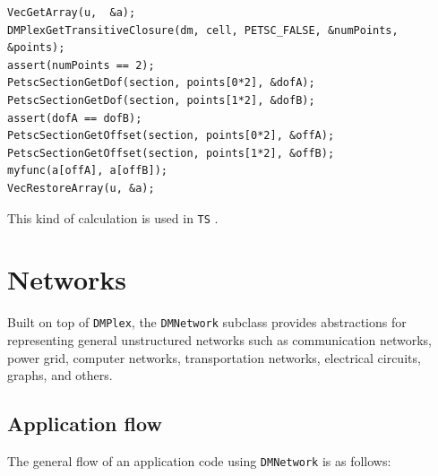 {\begin{lstlisting}
VecGetArray(u,  &a);
DMPlexGetTransitiveClosure(dm, cell, PETSC_FALSE, &numPoints, &points);
assert(numPoints == 2);
PetscSectionGetDof(section, points[0*2], &dofA);
PetscSectionGetDof(section, points[1*2], &dofB);
assert(dofA == dofB);
PetscSectionGetOffset(section, points[0*2], &offA);
PetscSectionGetOffset(section, points[1*2], &offB);
myfunc(a[offA], a[offB]);
VecRestoreArray(u, &a);
\end{lstlisting}
This kind of calculation is used in \lstinline{TS} \href{http://www.mcs.anl.gov/petsc/petsc-current/src/ts/examples/tutorials/ex11.c.html}{}.

\section{Networks}
Built on top of \lstinline{DMPlex}, the \lstinline{DMNetwork} subclass provides abstractions for representing general unstructured
networks such as communication networks, power grid, computer networks, transportation networks, electrical circuits, graphs, and others.

\subsection{Application flow}
The general flow of an application code using \lstinline{DMNetwork} is as follows:

}
